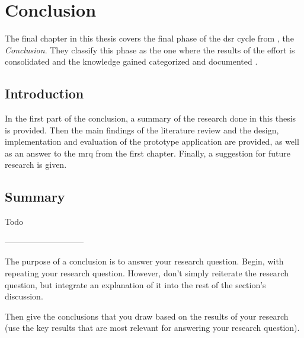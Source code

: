 
\chapter{Conclusion}

\label{ChapterConclusion}

The final chapter in this thesis covers the final phase of the \gls{dsr} cycle from \cite{Vaishnavi2008}, the \textit{Conclusion}. They classify this phase as the one where the results of the effort is consolidated and the knowledge gained categorized and documented \citep{Vaishnavi2008}.



\section{Introduction}

In the first part of the conclusion, a summary of the research done in this thesis is provided. Then the main findings of the literature review and the design, implementation and evaluation of the prototype application are provided, as well as an answer to the \gls{mrq} from the first chapter. Finally, a suggestion for future research is given.



\section{Summary}

Todo


-----------------------------

The purpose of a conclusion is to answer your research question. Begin, with repeating your research question. However, don’t simply reiterate the research question, but integrate an explanation of it into the rest of the section’s discussion.

Then give the conclusions that you draw based on the results of your research (use the key results that are most relevant for answering your research question).


